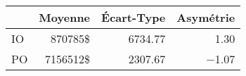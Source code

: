 \begin{tabular}{lrrr}
\toprule
{} &         Moyenne &    Écart-Type &   Asymétrie \\
\midrule
IO &  \num{870785}\$ & \num{6734.77} &  \num{1.30} \\
PO & \num{7156512}\$ & \num{2307.67} & \num{-1.07} \\
\bottomrule
\end{tabular}
